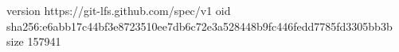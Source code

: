 version https://git-lfs.github.com/spec/v1
oid sha256:e6abb17c44bf3e8723510ee7db6c72e3a528448b9fc446fedd7785fd3305bb3b
size 157941
